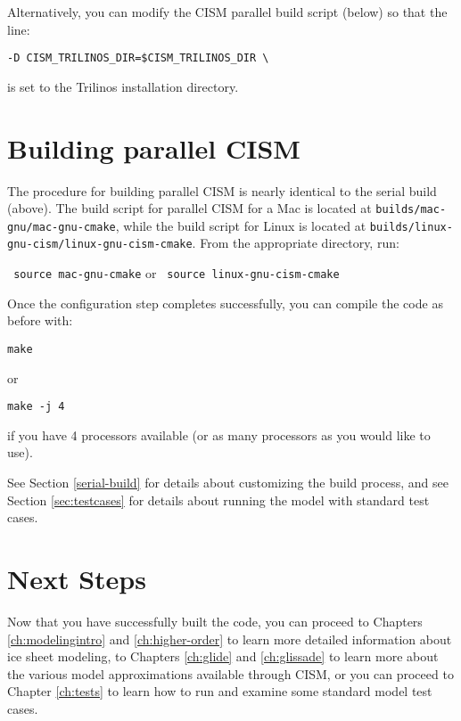 Alternatively, you can modify the CISM parallel build script (below) so that the line:
\begin{verbatim}
-D CISM_TRILINOS_DIR=$CISM_TRILINOS_DIR \
\end{verbatim}
is set to the Trilinos installation directory.





\section{Building parallel CISM}

The procedure for building parallel CISM is nearly identical to the serial build (above).
The build script for parallel CISM for a Mac is located at \texttt{builds/mac-gnu/mac-gnu-cmake}, 
while the build script for Linux is located at \texttt{builds/linux-gnu-cism/linux-gnu-cism-cmake}.
From the appropriate directory, run:

\texttt{ source mac-gnu-cmake} or \texttt{ source linux-gnu-cism-cmake}

Once the configuration step completes successfully, you can compile the code as before with:

\texttt{make}

or

\texttt{make -j 4}

if you have 4 processors available (or as many processors as you would like to use).

See Section \ref{serial-build} for details about customizing the build process, and 
see Section \ref{sec:testcases} for details about running the model with standard
test cases.


\section{Next Steps}

Now that you have successfully built the code, you can proceed to Chapters \ref{ch:modelingintro} and \ref{ch:higher-order} to learn more detailed 
information about ice sheet modeling, to Chapters \ref{ch:glide} and \ref{ch:glissade} to learn more about the various model approximations 
available through CISM, or you can proceed to Chapter \ref{ch:tests} to learn how to run and examine some standard model test cases.  


